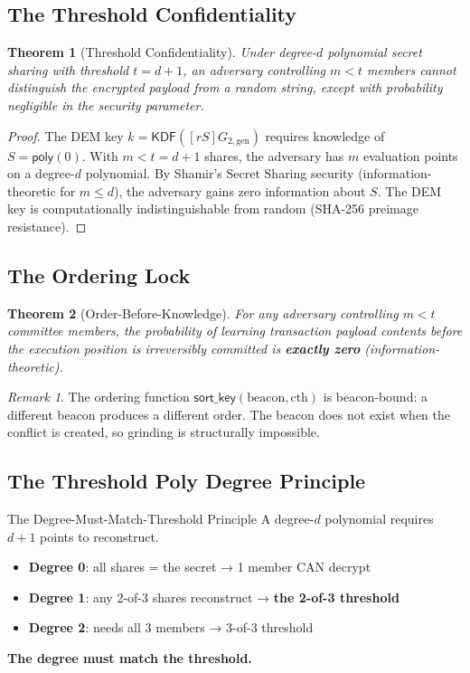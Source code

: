 \documentclass[11pt, a4paper]{article}
\theoremstyle{plain}
\newtheorem{theorem}{Theorem}
\theoremstyle{definition}
\theoremstyle{remark}
\newtheorem{remark}{Remark}
\begin{document}
\subsection{The Threshold Confidentiality}

\begin{theorem}[Threshold Confidentiality]
\label{thm:threshold}
Under degree-$d$ polynomial secret sharing with threshold $t = d+1$,
an adversary controlling $m < t$ members cannot distinguish the
encrypted payload from a random string, except with probability
negligible in the security parameter.
\end{theorem}
\begin{proof}
The DEM key $k = \mathsf{KDF}([rS]G_{2,\mathrm{gen}})$ requires
knowledge of $S = \mathsf{poly}(0)$. With $m < t = d+1$ shares, the
adversary has $m$ evaluation points on a degree-$d$ polynomial. By
Shamir's Secret Sharing security (information-theoretic for $m \le d$),
the adversary gains zero information about $S$. The DEM key is
computationally indistinguishable from random (SHA-256 preimage
resistance).
\end{proof}

\subsection{The Ordering Lock}

\begin{theorem}[Order-Before-Knowledge]
\label{thm:obk}
For any adversary controlling $m < t$ committee members, the
probability of learning transaction payload contents before the
execution position is irreversibly committed is \textbf{exactly zero}
(information-theoretic).
\end{theorem}

\begin{remark}
The ordering function $\textsf{sort\_key}(\text{beacon}, \text{cth})$ is beacon-bound: a different beacon produces a different order. The
beacon does not exist when the conflict is created, so grinding is
structurally impossible.
\end{remark}

\subsection{The Threshold Poly Degree Principle}

\begin{warnbox}{The Degree-Must-Match-Threshold Principle}
A degree-$d$ polynomial requires $d+1$ points to reconstruct.
\begin{itemize}
\item \textbf{Degree 0}: all shares = the secret → 1 member CAN decrypt
\item \textbf{Degree 1}: any 2-of-3 shares reconstruct → \textbf{the 2-of-3 threshold}
\item \textbf{Degree 2}: needs all 3 members → 3-of-3 threshold
\end{itemize}
\textbf{The degree must match the threshold.}
\end{warnbox}
\end{document}
